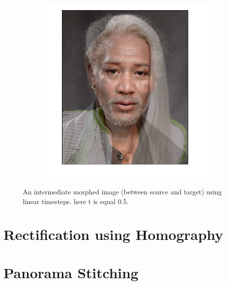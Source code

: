 \documentclass{paper}
\begin{document}
\begin{figure}[H]
    \centering
    \begin{subfigure}{1.0\textwidth}
        \includegraphics[width=\textwidth]{morph/intermediate_morph}
    \end{subfigure}
    
    \caption{An intermediate morphed image (between source and target) using linear timesteps. here t is equal 0.5.}
    \label{fig:morphing_intermediate}       
\end{figure}

\section{Rectification using Homography}
\section{Panorama Stitching}
\end{document}

